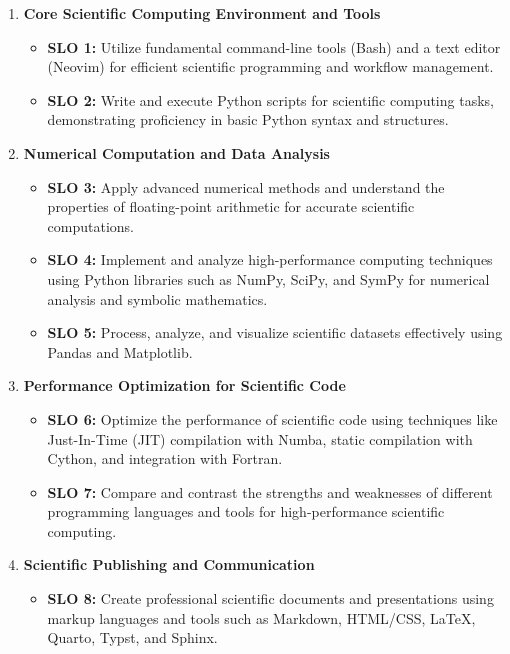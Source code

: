 \documentclass[11pt]{article}
\begin{document}
\begin{enumerate}
    \item \textbf{Core Scientific Computing Environment and Tools}
        \begin{itemize}
            \item \textbf{SLO 1:} Utilize fundamental command-line tools (Bash) and a text editor (Neovim) for efficient scientific programming and workflow management.
            \item \textbf{SLO 2:} Write and execute Python scripts for scientific computing tasks, demonstrating proficiency in basic Python syntax and structures.
        \end{itemize}
    \item \textbf{Numerical Computation and Data Analysis}
        \begin{itemize}
            \item \textbf{SLO 3:} Apply advanced numerical methods and understand the properties of floating-point arithmetic for accurate scientific computations.
            \item \textbf{SLO 4:} Implement and analyze high-performance computing techniques using Python libraries such as NumPy, SciPy, and SymPy for numerical analysis and symbolic mathematics.
            \item \textbf{SLO 5:} Process, analyze, and visualize scientific datasets effectively using Pandas and Matplotlib.
        \end{itemize}
    \item \textbf{Performance Optimization for Scientific Code}
        \begin{itemize}
            \item \textbf{SLO 6:} Optimize the performance of scientific code using techniques like Just-In-Time (JIT) compilation with Numba, static compilation with Cython, and integration with Fortran.
            \item \textbf{SLO 7:} Compare and contrast the strengths and weaknesses of different programming languages and tools for high-performance scientific computing.
        \end{itemize}
    \item \textbf{Scientific Publishing and Communication}
        \begin{itemize}
            \item \textbf{SLO 8:} Create professional scientific documents and presentations using markup languages and tools such as Markdown, HTML/CSS, LaTeX, Quarto, Typst, and Sphinx.
        \end{itemize}
\end{enumerate}
\end{document}
